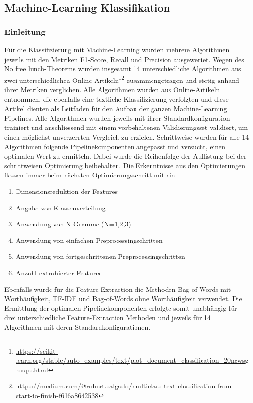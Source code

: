 \subsection{Machine-Learning Klassifikation}
\subsubsection{Einleitung}
Für die Klassifizierung mit Machine-Learning wurden mehrere Algorithmen jeweils mit den Metriken F1-Score, Recall und Precision ausgewertet.
Wegen des \glqq No free lunch\grqq{}-Theorems wurden insgesamt 14 unterschiedliche Algorithmen aus zwei unterschiedlichen Online-Artikeln\footnote{\url{https://scikit-learn.org/stable/auto_examples/text/plot_document_classification_20newsgroups.html}}\footnote{\url{https://medium.com/@robert.salgado/multiclass-text-classification-from-start-to-finish-f616a8642538}} zusammengetragen und stetig anhand ihrer Metriken verglichen.
Alle Algorithmen wurden aus Online-Artikeln entnommen, die ebenfalls eine textliche Klassifizierung verfolgten und diese Artikel dienten als Leitfaden für den Aufbau der ganzen Machine-Learning Pipelines.
Alle Algorithmen wurden jeweils mit ihrer Standardkonfiguration trainiert und anschliessend mit einem vorbehaltenen Validierungsset validiert, um einen möglichst unverzerrten Vergleich zu erzielen.
Schrittweise wurden für alle 14 Algorithmen folgende Pipelinekomponenten angepasst und versucht, einen optimalen Wert zu ermitteln.
Dabei wurde die Reihenfolge der Auflistung bei der schrittweisen Optimierung beibehalten.
Die Erkenntnisse aus den Optimierungen flossen immer beim nächsten Optimierungsschritt mit ein.
\begin{enumerate}
	\item Dimensionsreduktion der Features 
	\item Angabe von Klassenverteilung
	\item Anwendung von N-Gramme (N={1,2,3})
	\item Anwendung von einfachen Preprocessingschritten
	\item Anwendung von fortgeschrittenen Preprocessingschritten
	\item Anzahl extrahierter Features
\end{enumerate}
Ebenfalls wurde für die Feature-Extraction die Methoden Bag-of-Words mit Worthäufigkeit, TF-IDF und Bag-of-Words ohne Worthäufigkeit verwendet.
Die Ermittlung der optimalen Pipelinekomponenten erfolgte somit unabhängig für drei unterschiedliche Feature-Extraction Methoden und jeweils für 14 Algorithmen mit deren Standardkonfigurationen.
